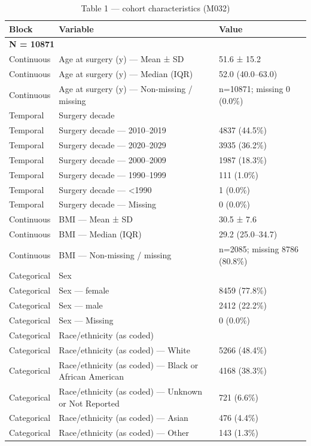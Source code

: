 \begin{table}[htbp]
\centering
\caption{Table 1 — cohort characteristics (M032)}
\label{tab:table1\_m032}
\begin{tabular}{lll}
\toprule
Block & Variable & Value \\
\midrule
\multicolumn{3}{l}{\textbf{N = 10871}} \\
Continuous & Age at surgery (y) — Mean ± SD & 51.6 ± 15.2 \\
Continuous & Age at surgery (y) — Median (IQR) & 52.0 (40.0–63.0) \\
Continuous & Age at surgery (y) — Non-missing / missing & n=10871; missing 0 (0.0\%) \\
Temporal & Surgery decade &  \\
Temporal & Surgery decade — 2010–2019 & 4837 (44.5\%) \\
Temporal & Surgery decade — 2020–2029 & 3935 (36.2\%) \\
Temporal & Surgery decade — 2000–2009 & 1987 (18.3\%) \\
Temporal & Surgery decade — 1990–1999 & 111 (1.0\%) \\
Temporal & Surgery decade — <1990 & 1 (0.0\%) \\
Temporal & Surgery decade — Missing & 0 (0.0\%) \\
Continuous & BMI — Mean ± SD & 30.5 ± 7.6 \\
Continuous & BMI — Median (IQR) & 29.2 (25.0–34.7) \\
Continuous & BMI — Non-missing / missing & n=2085; missing 8786 (80.8\%) \\
Categorical & Sex &  \\
Categorical & Sex — female & 8459 (77.8\%) \\
Categorical & Sex — male & 2412 (22.2\%) \\
Categorical & Sex — Missing & 0 (0.0\%) \\
Categorical & Race/ethnicity (as coded) &  \\
Categorical & Race/ethnicity (as coded) — White & 5266 (48.4\%) \\
Categorical & Race/ethnicity (as coded) — Black or African American & 4168 (38.3\%) \\
Categorical & Race/ethnicity (as coded) — Unknown or Not Reported & 721 (6.6\%) \\
Categorical & Race/ethnicity (as coded) — Asian & 476 (4.4\%) \\
Categorical & Race/ethnicity (as coded) — Other & 143 (1.3\%) \\

\end{tabular}
\end{table}
